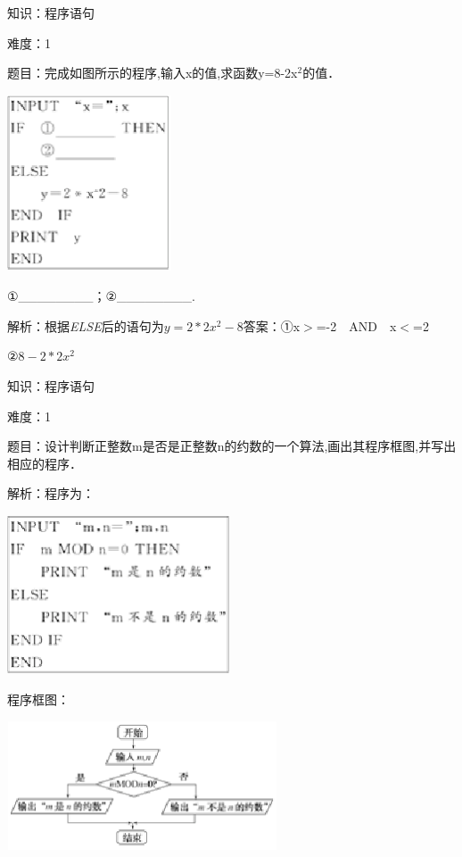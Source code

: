 \documentclass{article} %
\begin{document}
知识：程序语句

难度：1

题目：完成如图所示的程序,输入x的值,求函数y={\textbar}8-2x${}^{2}${\textbar}的值．

\textit{\includegraphics*[width=1.92in, height=2.06in, keepaspectratio=false]{image56}}

①\_\_\_\_\_\_\_\_；②\_\_\_\_\_\_\_\_.

解析：根据\textit{ELSE}后的语句为$y=2*2x^2-8$答案：①x$\mathrm{>}$=-2　AND　x$\mathrm{<}$=2

②$8-2*2x^2$

知识：程序语句

难度：1

题目：设计判断正整数m是否是正整数n的约数的一个算法,画出其程序框图,并写出相应的程序．

解析：程序为：

\textit{\includegraphics*[width=2.61in, height=1.86in, keepaspectratio=false]{image57}}

程序框图：

\includegraphics*[width=3.15in, height=1.50in, keepaspectratio=false]{image58}
\end{document}
